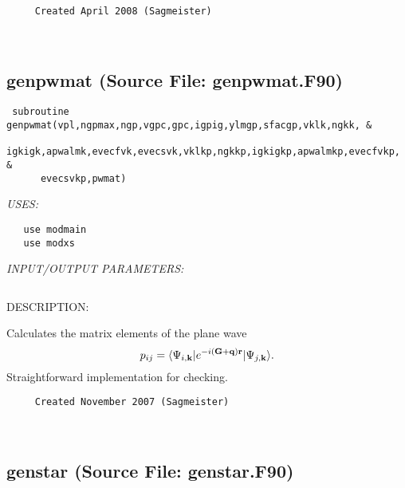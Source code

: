 \documentclass[11pt]{article}
\begin{document}
\begin{verbatim}     Created April 2008 (Sagmeister)\end{verbatim}


 
 
\mbox{}\hrulefill\ 
 
\subsection{genpwmat (Source File: genpwmat.F90)}


\begin{verbatim} subroutine genpwmat(vpl,ngpmax,ngp,vgpc,gpc,igpig,ylmgp,sfacgp,vklk,ngkk, &
      igkigk,apwalmk,evecfvk,evecsvk,vklkp,ngkkp,igkigkp,apwalmkp,evecfvkp, &
      evecsvkp,pwmat)\end{verbatim}{\em USES:}
\begin{verbatim}   use modmain
   use modxs\end{verbatim}{\em INPUT/OUTPUT PARAMETERS:}
\begin{verbatim} \end{verbatim}
{\sf DESCRIPTION:\\ }

    Calculates the matrix elements of the plane wave
     $$ p_{ij}=\langle\Psi_{i,{\bf k}}|e^{-i({\bf G}+{\bf q}){\bf r}}|
        \Psi_{j,{\bf k}}\rangle. $$
    Straightforward implementation for checking.
  
\begin{verbatim}     Created November 2007 (Sagmeister)\end{verbatim}






 
 
\mbox{}\hrulefill\ 
 
\subsection{genstar (Source File: genstar.F90)}
\end{document}
